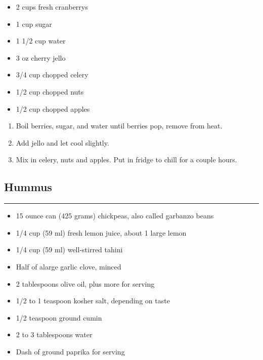 \documentclass{article}
\begin{document}
\begin{framed}
    \begin{itemize}
        \item 2 cups fresh cranberrys
        \item 1 cup sugar
        \item 1 1/2 cup water
        \item 3 oz cherry jello 
        \item 3/4 cup chopped celery 
        \item 1/2 cup chopped nuts 
        \item 1/2 cup chopped apples
    \end{itemize}
\end{framed}

\begin{enumerate}
    \item 
        Boil berries, sugar, and water until berries pop, remove from heat.
    \item 
        Add jello and let cool slightly.
    \item 
        Mix in celery, nuts and apples. Put in fridge to chill for a couple hours.
\end{enumerate}
\newpage

\subsection{Hummus} 
\noindent\rule[0.5ex]{\linewidth}{1pt}

\begin{framed}
    \begin{itemize}
        \item 15 ounce can (425 grams) chickpeas, also called garbanzo beans
        \item 1/4 cup (59 ml) fresh lemon juice, about 1 large lemon
        \item 1/4 cup (59 ml) well-stirred tahini
        \item Half of alarge garlic clove, minced
        \item 2 tablespoons olive oil, plus more for serving
        \item 1/2 to 1 teaspoon kosher salt, depending on taste
        \item 1/2 teaspoon ground cumin
        \item 2 to 3 tablespoons water
        \item Dash of ground paprika for serving
    \end{itemize}
\end{framed}
\end{document}
